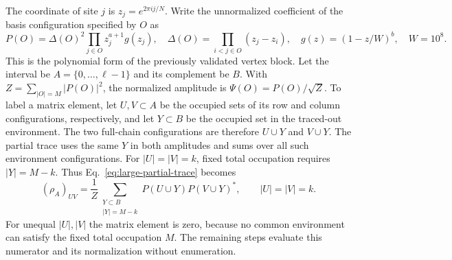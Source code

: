 The coordinate of site $j$ is $z_j=e^{2\pi i j/N}$.
Write the unnormalized coefficient of the basis configuration specified
by $O$ as
\begin{equation}
 P(O)=\Delta(O)^2\prod_{j\in O}z_j^{a+1}g(z_j),\quad
 \Delta(O)=\prod_{i<j\in O}(z_j-z_i),\quad
 g(z)=(1-z/W)^b,\quad W=10^8.
 \label{eq:pf-amplitude}
\end{equation}
This is the polynomial form of the previously validated vertex block.
Let the interval be $A=\{0,\ldots,\ell-1\}$ and its complement be $B$.
With $Z=\sum_{|O|=M}|P(O)|^2$, the normalized amplitude is
$\Psi(O)=P(O)/\sqrt Z$. To label a matrix element, let $U,V\subset A$
be the occupied sets of its row and column configurations, respectively,
and let $Y\subset B$ be the occupied set in the traced-out environment.
The two full-chain configurations are therefore $U\cup Y$ and $V\cup Y$.
The partial trace uses the same $Y$ in both amplitudes and sums over
all such environment configurations. For $|U|=|V|=k$, fixed total
occupation requires $|Y|=M-k$. Thus Eq.~\eqref{eq:large-partial-trace} becomes
\begin{equation}
 (\rho_A)_{UV}=\frac1Z
 \sum_{\substack{Y\subset B\\|Y|=M-k}}
 P(U\cup Y)P(V\cup Y)^*,\qquad |U|=|V|=k.
 \label{eq:boson-environment-sum}
\end{equation}
For unequal $|U|,|V|$ the matrix element is zero, because no common
environment can satisfy the fixed total occupation $M$. The remaining
steps evaluate this numerator and its normalization without enumeration.


